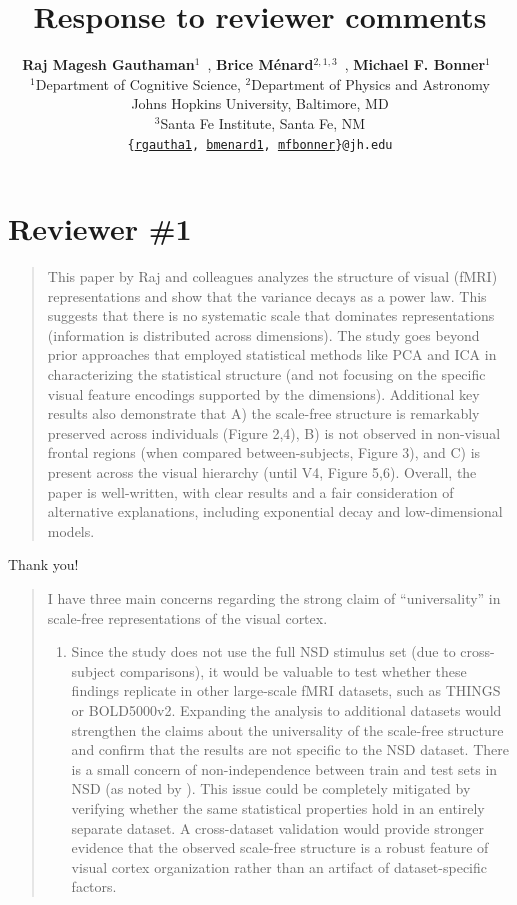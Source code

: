 \documentclass[10pt]{article}
\title{Response to reviewer comments}
\author{
    \textbf{Raj Magesh Gauthaman$^1$}~\orcidlink{0000-0001-7121-1532},
    \textbf{Brice Ménard$^{2,1,3}$}~\orcidlink{0000-0003-3164-6974},
    \textbf{Michael F. Bonner$^1$}~\orcidlink{0000-0002-4992-674X}\\
    $^1$Department of Cognitive Science,
    $^2$Department of Physics and Astronomy\\
    Johns Hopkins University, Baltimore, MD\\
    $^3$Santa Fe Institute, Santa Fe, NM\\
    \texttt{\{\href{mailto:rgautha1@jh.edu}{rgautha1}, \href{mailto:bmenard1@jh.edu}{bmenard1}, \href{mailto:mfbonner@jh.edu}{mfbonner}\}@jh.edu}
}
\date{}
\providecommand{\tightlist}{\setlength{\itemsep}{0pt}\setlength{\parskip}{0pt}}
\begin{document}
\maketitle

\section{Reviewer \#1}\label{reviewer-1}

\begin{quote}
This paper by Raj and colleagues analyzes the structure of visual (fMRI) representations and show that the variance decays as a power law. This suggests that there is no systematic scale that dominates representations (information is distributed across dimensions). The study goes beyond prior approaches that employed statistical methods like PCA and ICA in characterizing the statistical structure (and not focusing on the specific visual feature encodings supported by the dimensions). Additional key results also demonstrate that A) the scale-free structure is remarkably preserved across individuals (Figure 2,4), B) is not observed in non-visual frontal regions (when compared between-subjects, Figure 3), and C) is present across the visual hierarchy (until V4, Figure 5,6). Overall, the paper is well-written, with clear results and a fair consideration of alternative explanations, including exponential decay and low-dimensional models.
\end{quote}

Thank you!

\begin{quote}
I have three main concerns regarding the strong claim of ``universality'' in scale-free representations of the visual cortex.

\begin{enumerate}
\def\labelenumi{\arabic{enumi}.}
\tightlist
\item
  Since the study does not use the full NSD stimulus set (due to cross-subject comparisons), it would be valuable to test whether these findings replicate in other large-scale fMRI datasets, such as THINGS or BOLD5000v2. Expanding the analysis to additional datasets would strengthen the claims about the universality of the scale-free structure and confirm that the results are not specific to the NSD dataset. There is a small concern of non-independence between train and test sets in NSD (as noted by \textcite{Shirakawa2024}). This issue could be completely mitigated by verifying whether the same statistical properties hold in an entirely separate dataset. A cross-dataset validation would provide stronger evidence that the observed scale-free structure is a robust feature of visual cortex organization rather than an artifact of dataset-specific factors.
\end{enumerate}
\end{quote}
\end{document}
